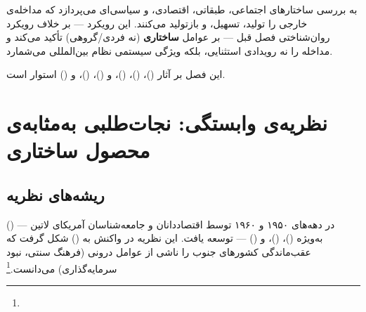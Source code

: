 \begin{tcolorbox}[defbox, title={مفهوم کلیدی: جامعه‌شناسی سیاسی مداخله}]
 به بررسی ساختارهای اجتماعی، طبقاتی، اقتصادی، و سیاسی‌ای می‌پردازد که مداخله‌ی خارجی را تولید، تسهیل، و بازتولید می‌کنند. این رویکرد — بر خلاف رویکرد روان‌شناختی فصل قبل — بر عوامل \textbf{ساختاری} (نه فردی/گروهی) تأکید می‌کند و مداخله را نه رویدادی استثنایی، بلکه ویژگی سیستمی نظام بین‌المللی می‌شمارد.
\end{tcolorbox}

این فصل بر آثار  ()،  ()،  ()،  و  ()،  ()، و  () استوار است.


\section{نظریه‌ی وابستگی: نجات‌طلبی به‌مثابه‌ی محصول ساختاری}
\label{sec:ch12-dependency}

\subsection{ریشه‌های نظریه}
\label{subsec:ch12-dependency-origins}

 () در دهه‌های ۱۹۵۰ و ۱۹۶۰ توسط اقتصاددانان و جامعه‌شناسان آمریکای لاتین — به‌ویژه  ()،  ()، و  () — توسعه یافت. این نظریه در واکنش به  () شکل گرفت که عقب‌ماندگی کشورهای جنوب را ناشی از عوامل درونی (فرهنگ سنتی، نبود سرمایه‌گذاری) می‌دانست.\footnote{}

